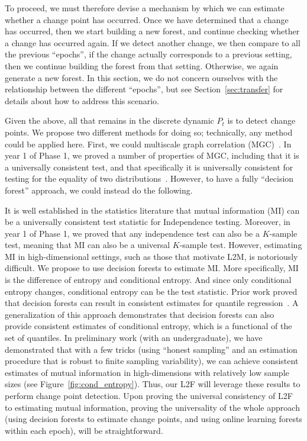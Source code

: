 \documentclass{article}
\begin{document}
To proceed, we must therefore devise a mechanism by which we can estimate whether a change point has occurred. Once we have determined that a change has occurred, then we start building a new forest, and continue checking whether a change has occurred again.  If we detect another change, we then compare to all the previous ``epochs'', if the change actually corresponds to a previous setting, then we continue building the forest from that setting.  Otherwise, we again generate a new forest. In this section, we do not concern ourselves with the relationship between the different ``epochs'', but see Section~\ref{sec:transfer} for details about how to address this scenario.   

Given the above, all that remains in the discrete dynamic $P_t$ is to detect change points. We propose two different methods for doing so; technically, any method could be applied here. First, we could multiscale graph correlation (MGC)~\cite{mgc1, mgc2}.  In year 1 of Phase 1, we proved a number of properties of MGC, including that it is a universally consistent test, and that specifically it is universally consistent for testing for the equality of two distributions~\cite{exact}.  However, to have a fully ``decision forest'' approach, we could instead do the following. 

It is well established in the statistics literature that mutual information (MI) can be a universally consistent test statistic for Independence testing.  Moreover, in year 1 of Phase 1, we proved that any independence test can also be a $K$-sample test, meaning that MI can also be a universal $K$-sample test. However, estimating MI in high-dimensional settings, such as those that motivate L2M, is notoriously difficult.  We propose to use decision forests to estimate MI.  More specifically,  MI is the difference of entropy and conditional entropy.  And since only conditional entropy changes, conditional entropy can be the test statistic.  Prior work proved that decision forests can result in consistent estimates for quantile regression~\cite{Meinhasser2006}.  A generalization of this approach demonstrates that decision forests can also provide consistent estimates of conditional entropy, which is a functional of the set of quantiles.  In preliminary work (with an undergraduate), we have demonstrated that with a few tricks (using ``honest sampling'' and an estimation procedure that is robust to finite sampling variability), we can achieve consistent estimates of mutual information in high-dimensions with relatively low sample sizes (see Figure~\ref{fig:cond_entropy}). Thus, our L2F will leverage these results to perform change point detection. Upon proving the universal consistency of L2F to estimating mutual information, proving the universality of the whole approach (using decision forests to estimate change points, and using online learning forests within each epoch), will be straightforward. 
\end{document}
